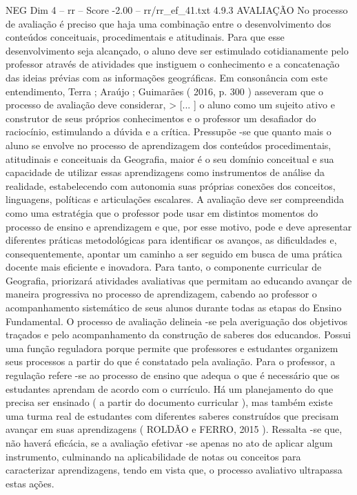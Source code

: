 \begin{textsample}{NEG Dim 4 – rr – Score -2.00 – rr/rr\_ef\_41.txt}  \label{ex:f4_neg_174}
4.9.3 AVALIAÇÃO No processo de avaliação é preciso que haja uma combinação entre o desenvolvimento dos conteúdos conceituais, procedimentais e atitudinais.
Para que esse desenvolvimento seja alcançado, o aluno deve ser estimulado cotidianamente pelo professor através de atividades que instiguem o conhecimento e a concatenação das ideias prévias com as informações geográficas.
Em consonância com este entendimento, Terra ; Araújo ; Guimarães ( 2016, p. 300 ) asseveram que o processo de avaliação deve considerar, > [... ] o aluno como um sujeito ativo e construtor de seus próprios conhecimentos e o professor um desafiador do raciocínio, estimulando a dúvida e a crítica.
Pressupõe -se que quanto mais o aluno se envolve no processo de aprendizagem dos conteúdos procedimentais, atitudinais e conceituais da Geografia, maior é o seu domínio conceitual e sua capacidade de utilizar essas aprendizagens como instrumentos de análise da realidade, estabelecendo com autonomia suas próprias conexões dos conceitos, linguagens, políticas e articulações escalares.
A avaliação deve ser compreendida como uma estratégia que o professor pode usar em distintos momentos do processo de ensino e aprendizagem e que, por esse motivo, pode e deve apresentar diferentes práticas metodológicas para identificar os avanços, as dificuldades e, consequentemente, apontar um caminho a ser seguido em busca de uma prática docente mais eficiente e inovadora.
Para tanto, o componente curricular de Geografia, priorizará atividades avaliativas que permitam ao educando avançar de maneira progressiva no processo de aprendizagem, cabendo ao professor o acompanhamento sistemático de seus alunos durante todas as etapas do Ensino Fundamental.
O processo de avaliação delineia -se pela averiguação dos objetivos traçados e pelo acompanhamento da construção de saberes dos educandos.
Possui uma função reguladora porque permite que professores e estudantes organizem seus processos a partir do que é constatado pela avaliação.
Para o professor, a regulação refere -se ao processo de ensino que adequa o que é necessário que os estudantes aprendam de acordo com o currículo.
Há um planejamento do que precisa ser ensinado ( a partir do documento curricular ), mas também existe uma turma real de estudantes com diferentes saberes construídos que precisam avançar em suas aprendizagens ( ROLDÃO e FERRO, 2015 ).
Ressalta -se que, não haverá eficácia, se a avaliação efetivar -se apenas no ato de aplicar algum instrumento, culminando na aplicabilidade de notas ou conceitos para caracterizar aprendizagens, tendo em vista que, o processo avaliativo ultrapassa estas ações.

\end{textsample}
